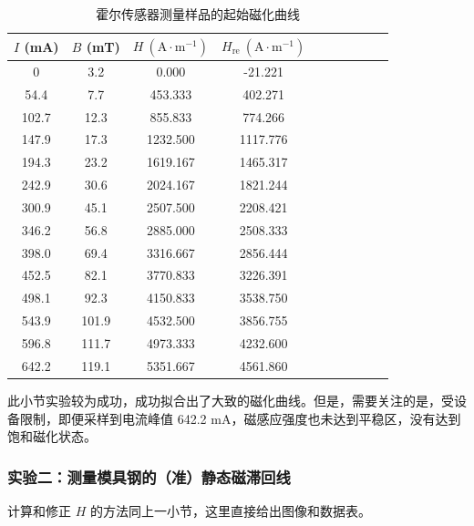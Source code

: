 \documentclass[UTF8]{article}
\theoremstyle{MyLineTheoremStyle} %
\theoremstyle{MyBlockTheoremStyle} %
\theoremstyle{MySubsubsectionStyle} %
\begin{document}
\begin{table}[H]\centering
    \caption{霍尔传感器测量样品的起始磁化曲线}
    \label{2.1表}
\begin{tabular}{cccccccccc}\toprule
    $I$ (mA) & $B$ (mT) & $H \ \mathrm{(A\cdot m^{-1})}$ &  $H_{\text{re}} \ \mathrm{(A\cdot m^{-1})}$   \\
    \midrule
    0	    & 3.2	& 0.000	    & -21.221   \\
    54.4	& 7.7	& 453.333	& 402.271   \\
    102.7	& 12.3	& 855.833	& 774.266   \\
    147.9	& 17.3	& 1232.500	& 1117.776  \\
    194.3	& 23.2	& 1619.167	& 1465.317  \\
    242.9	& 30.6	& 2024.167	& 1821.244  \\
    300.9	& 45.1	& 2507.500	& 2208.421  \\
    346.2	& 56.8	& 2885.000	& 2508.333  \\
    398.0	& 69.4	& 3316.667	& 2856.444  \\
    452.5	& 82.1	& 3770.833	& 3226.391  \\
    498.1	& 92.3	& 4150.833	& 3538.750  \\
    543.9	& 101.9	& 4532.500	& 3856.755  \\
    596.8	& 111.7	& 4973.333	& 4232.600  \\
    642.2	& 119.1	& 5351.667	& 4561.860  \\
    \bottomrule
\end{tabular}
\end{table}

此小节实验较为成功，成功拟合出了大致的磁化曲线。但是，需要关注的是，受设备限制，即便采样到电流峰值 642.2 mA，磁感应强度也未达到平稳区，没有达到饱和磁化状态。

\subsubsection{实验二：测量模具钢的（准）静态磁滞回线}

计算和修正 $H$ 的方法同上一小节，这里直接给出图像和数据表。
\end{document}
